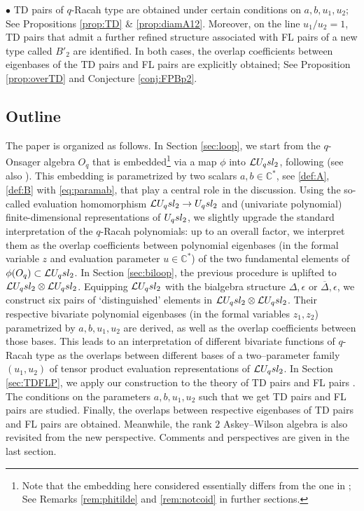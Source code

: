 \documentclass[11pt]{amsart}
\numberwithin{equation}{section}
\numberwithin{equation}{section}
\begin{document}
 $\bullet$ TD pairs of $q$-Racah type are obtained  under certain conditions on $a,b,u_1,u_2$; See Propositions \ref{prop:TD} \& \ref{prop:diamA12}. Moreover, on the line $u_1/u_2=1$, TD pairs that admit a further refined structure associated with FL pairs of a new type called $B'_2$ are identified. In both cases, the overlap coefficients between eigenbases of the TD pairs and FL pairs are explicitly obtained; See Proposition \ref{prop:overTD} and Conjecture \ref{conj:FPBp2}. 

  \subsection{Outline}
      The paper is organized as follows. In Section \ref{sec:loop}, we start from the $q$-Onsager algebra $O_q$  that is embedded\footnote{Note that the embedding here considered essentially differs from the one in \cite{IT10,Ito14,Ito2}; See Remarks \ref{rem:phitilde} and \ref{rem:notcoid} in further sections.} via a map $\phi$ into $\mathcal{L} U_q sl_2$, following \cite{BB09} (see also \cite{BVZ16}). This embedding is parametrized by two scalars $a,b \in {\mathbb C}^*$, see \eqref{def:A}, \eqref{def:B} with \eqref{eq:paramab}, that play a central role in the discussion. Using the so-called evaluation homomorphism $\mathcal{L} U_q sl_2\rightarrow U_q sl_2$ and (univariate
 polynomial) finite-dimensional representations of $U_q sl_2$, we slightly upgrade the standard interpretation of the $q$-Racah polynomials: up to an overall factor, we interpret them as the overlap coefficients between
 polynomial eigenbases (in the formal variable $z$ and evaluation parameter $u\in {\mathbb C}^*$) of the two fundamental elements of $\phi(O_q)\subset \mathcal{L} U_q sl_2$. 
In Section \ref{sec:biloop}, the previous procedure is uplifted to $\mathcal{L} U_q sl_2 \otimes \mathcal{L} U_q sl_2$. Equipping $\mathcal{L} U_q sl_2$ with the bialgebra structure $\Delta,\epsilon$ or  $\overline\Delta,\epsilon$, we construct six pairs of `distinguished' elements in $\mathcal{L} U_q sl_2\otimes\mathcal{L} U_q sl_2$. Their respective bivariate polynomial eigenbases (in the formal variables $z_1,z_2$)  parametrized by $a,b,u_1,u_2$ are derived, as well as the overlap coefficients between those bases. This leads to an interpretation of different bivariate functions  of $q$-Racah type as the overlaps between different bases of a two--parameter family $(u_1,u_2)$ of tensor product evaluation representations of $\mathcal{L} U_q sl_2$. 
In Section \ref{sec:TDFLP}, we apply our construction to the theory of TD pairs \cite{Ter03} and FL pairs \cite{CZ23}. The conditions on the parameters $a,b,u_1,u_2$ such that we get  TD pairs and FL pairs are studied. Finally, the overlaps between respective eigenbases of TD pairs and FL pairs are obtained. Meanwhile, the rank $2$ Askey--Wilson algebra is also revisited from the new perspective. Comments and perspectives are given in the last section. 
 
\end{document}
